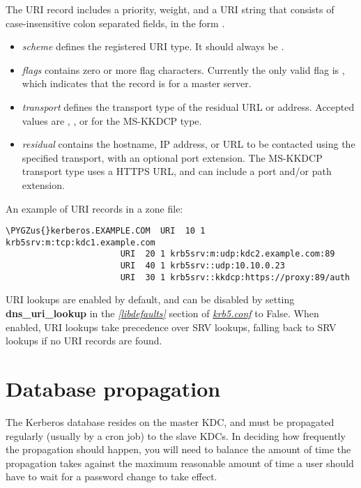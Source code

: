 \documentclass[letterpaper,10pt,english]{sphinxmanual}
\def\PYGZus{\char`\_}
\begin{document}
The URI record includes a priority, weight, and a URI string that
consists of case-insensitive colon separated fields, in the form
.
\begin{itemize}
\item {} 
\emph{scheme} defines the registered URI type.  It should always be
.

\item {} 
\emph{flags} contains zero or more flag characters.  Currently the only
valid flag is , which indicates that the record is for a master
server.

\item {} 
\emph{transport} defines the transport type of the residual URL or
address.  Accepted values are , , or  for the
MS-KKDCP type.

\item {} 
\emph{residual} contains the hostname, IP address, or URL to be
contacted using the specified transport, with an optional port
extension.  The MS-KKDCP transport type uses a HTTPS URL, and can
include a port and/or path extension.

\end{itemize}

An example of URI records in a zone file:

\begin{Verbatim}[commandchars=\\\{\}]
\PYGZus{}kerberos.EXAMPLE.COM  URI  10 1 krb5srv:m:tcp:kdc1.example.com
                       URI  20 1 krb5srv:m:udp:kdc2.example.com:89
                       URI  40 1 krb5srv::udp:10.10.0.23
                       URI  30 1 krb5srv::kkdcp:https://proxy:89/auth
\end{Verbatim}

URI lookups are enabled by default, and can be disabled by setting
\textbf{dns\_uri\_lookup} in the {\hyperref[admin/conf_files/krb5_conf:libdefaults]{\emph{{[}libdefaults{]}}}} section of
{\hyperref[admin/conf_files/krb5_conf:krb5-conf-5]{\emph{krb5.conf}}} to False.  When enabled, URI lookups take
precedence over SRV lookups, falling back to SRV lookups if no URI
records are found.


\section{Database propagation}
\label{admin/realm_config:database-propagation}\label{admin/realm_config:db-prop}
The Kerberos database resides on the master KDC, and must be
propagated regularly (usually by a cron job) to the slave KDCs.  In
deciding how frequently the propagation should happen, you will need
to balance the amount of time the propagation takes against the
maximum reasonable amount of time a user should have to wait for a
password change to take effect.
\end{document}
